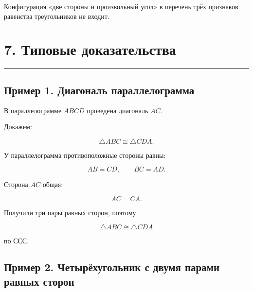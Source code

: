 \documentclass[a4paper,12pt]{article}
\newcommand{\sectionline}{
  \par
  \vspace{0.2em}
  \textcolor{lightline}{\rule{\linewidth}{0.8pt}}
  \par
  \vspace{0.35em}
}
\begin{document}
Конфигурация
«две стороны и произвольный угол»
в перечень трёх признаков равенства треугольников
не входит.


\section*{7. Типовые доказательства}
\sectionline

\subsection*{Пример 1. Диагональ параллелограмма}

В параллелограмме $ABCD$
проведена диагональ $AC$.

Докажем:

\[
\triangle ABC\cong\triangle CDA.
\]

У параллелограмма противоположные стороны равны:

\[
AB=CD,
\qquad
BC=AD.
\]

Сторона $AC$ общая:

\[
AC=CA.
\]

Получили три пары равных сторон, поэтому

\[
\triangle ABC\cong\triangle CDA
\]

по ССС.

\begin{center}


\end{center}

\subsection*{Пример 2. Четырёхугольник с двумя парами равных сторон}
\end{document}
